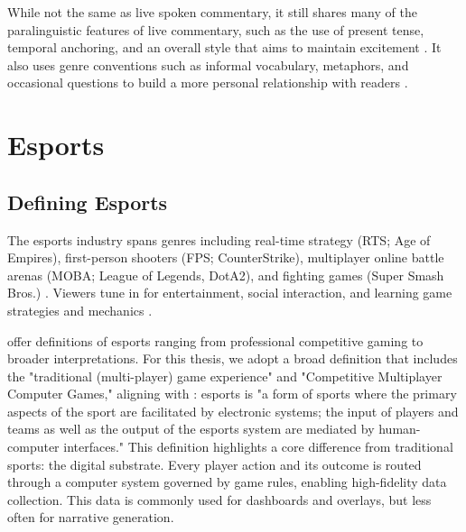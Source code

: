 While not the same as live spoken commentary, it still shares many of the paralinguistic features of live commentary, such as the use of present tense, temporal anchoring, and an overall style that aims to maintain excitement \cite{lewandowski2012}. It also uses genre conventions such as informal vocabulary, metaphors, and occasional questions to build a more personal relationship with readers \cite{lewandowski2012,pavzanin2022}.

\section{Esports}
\subsection{Defining Esports}
The esports industry spans genres including real-time strategy (RTS; Age of Empires), first-person shooters (FPS; CounterStrike), multiplayer online battle arenas (MOBA; League of Legends, DotA2), and fighting games (Super Smash Bros.) \cite{reitman2020}. Viewers tune in for entertainment, social interaction, and learning game strategies and mechanics \cite{sjoblom2017}.

\citet{cranmer2021} offer definitions of esports ranging from professional competitive gaming to broader interpretations. For this thesis, we adopt a broad definition that includes the "traditional (multi-player) game experience" and "Competitive Multiplayer Computer Games," aligning with \citet{hamari2017}: esports is "a form of sports where the primary aspects of the sport are facilitated by electronic systems; the input of players and teams as well as the output of the esports system are mediated by human-computer interfaces." This definition highlights a core difference from traditional sports: the digital substrate. Every player action and its outcome is routed through a computer system governed by game rules, enabling high-fidelity data collection. This data is commonly used for dashboards and overlays, but less often for narrative generation.

